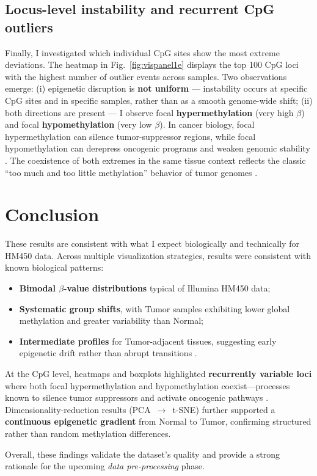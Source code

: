 \documentclass[10pt]{extarticle}
\begin{document}
\subsection{Locus-level instability and recurrent CpG outliers}
Finally, I investigated which individual CpG sites show the most extreme deviations.  
The heatmap in Fig.~\ref{fig:vispanel1e} displays the top 100 CpG loci with the highest number of outlier events across samples.  
Two observations emerge:  
(i) epigenetic disruption is \textbf{not uniform} --- instability occurs at specific CpG sites and in specific samples, rather than as a smooth genome-wide shift;  
(ii) both directions are present --- I observe focal \textbf{hypermethylation} (very high $\beta$) and focal \textbf{hypomethylation} (very low $\beta$).  
In cancer biology, focal hypermethylation can silence tumor-suppressor regions, while focal hypomethylation can derepress oncogenic programs and weaken genomic stability \cite{ref8}.  
The coexistence of both extremes in the same tissue context reflects the classic “too much and too little methylation” behavior of tumor genomes \cite{ref8}.

\section{Conclusion}

These results are consistent with what I expect biologically and technically for HM450 data.  
Across multiple visualization strategies, results were consistent with known biological patterns:  
\begin{itemize}[label=-]
\item \textbf{Bimodal $\beta$-value distributions} typical of Illumina HM450 data;  
\item \textbf{Systematic group shifts}, with Tumor samples exhibiting lower global methylation and greater variability than Normal;  
\item \textbf{Intermediate profiles} for Tumor-adjacent tissues, suggesting early epigenetic drift rather than abrupt transitions \cite{ref12,ref13}.  
\end{itemize}

At the CpG level, heatmaps and boxplots highlighted \textbf{recurrently variable loci} where both focal hypermethylation and hypomethylation coexist—processes known to silence tumor suppressors and activate oncogenic pathways \cite{ref8}.  
Dimensionality-reduction results (PCA~$\rightarrow$~t-SNE) further supported a \textbf{continuous epigenetic gradient} from Normal to Tumor, confirming structured rather than random methylation differences.

\vspace{0.3cm}

\noindent Overall, these findings validate the dataset’s quality and provide a strong rationale for the upcoming \textit{data pre-processing} phase.  





\printbibliography
\end{document}
